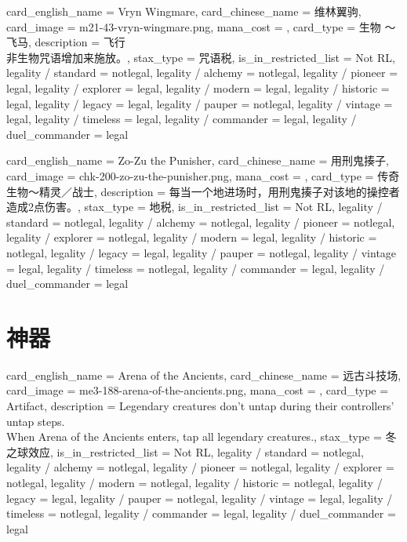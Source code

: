 \documentclass[lang = cn, color = black, 10pt]{AllThatStax}
\begin{document}
\card
{
	card_english_name = {Vryn Wingmare},
	card_chinese_name = {维林翼驹},
	card_image = m21-43-vryn-wingmare.png,
	mana_cost = ,
	card_type = 生物 ～飞马,
	description = {飞行\\
		非生物咒语增加来施放。},
	stax_type = 咒语税,
	is_in_restricted_list = Not RL,
	legality / standard = notlegal,
	legality / alchemy = notlegal,
	legality / pioneer = legal,
	legality / explorer = legal,
	legality / modern = legal,
	legality / historic = legal,
	legality / legacy = legal,
	legality / pauper = notlegal,
	legality / vintage = legal,
	legality / timeless = legal,
	legality / commander = legal,
	legality / duel_commander = legal
}

\card
{
	card_english_name = {Zo-Zu the Punisher},
	card_chinese_name = {用刑鬼揍子},
	card_image = chk-200-zo-zu-the-punisher.png,
	mana_cost = ,
	card_type = 传奇生物～精灵／战士,
	description = {每当一个地进场时，用刑鬼揍子对该地的操控者造成2点伤害。},
	stax_type = 地税,
	is_in_restricted_list = Not RL,
	legality / standard = notlegal,
	legality / alchemy = notlegal,
	legality / pioneer = notlegal,
	legality / explorer = notlegal,
	legality / modern = legal,
	legality / historic = notlegal,
	legality / legacy = legal,
	legality / pauper = notlegal,
	legality / vintage = legal,
	legality / timeless = notlegal,
	legality / commander = legal,
	legality / duel_commander = legal
}

\section{神器}

\card
{
	card_english_name = {Arena of the Ancients},
	card_chinese_name = {远古斗技场},
	card_image = me3-188-arena-of-the-ancients.png,
	mana_cost = ,
	card_type = Artifact,
	description = {Legendary creatures don't untap during their controllers' untap steps.\\
		When Arena of the Ancients enters, tap all legendary creatures.},
	stax_type = 冬之球效应,
	is_in_restricted_list = Not RL,
	legality / standard = notlegal,
	legality / alchemy = notlegal,
	legality / pioneer = notlegal,
	legality / explorer = notlegal,
	legality / modern = notlegal,
	legality / historic = notlegal,
	legality / legacy = legal,
	legality / pauper = notlegal,
	legality / vintage = legal,
	legality / timeless = notlegal,
	legality / commander = legal,
	legality / duel_commander = legal
}
\end{document}
